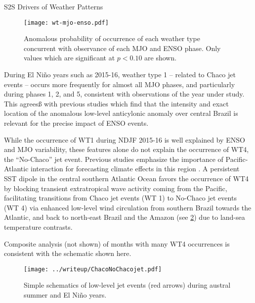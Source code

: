 \begin{block}{S2S Drivers of Weather Patterns}
  \begin{mdframed}
  \begin{figure}
    \caption{
  		Anomalous probability of occurrence of each weather type concurrent with observance of each MJO and ENSO phase.
  		Only values which are significant at $p<0.10$ are shown.
      \label{fig:wt-mjo-enso}
  	}
  	\noindent\texttt{[image: wt-mjo-enso.pdf]}
  \end{figure}
  \end{mdframed}

  During El Ni\~{n}o years such as 2015-16, weather type 1 -- related to Chaco jet events -- occurs more frequently for almost all MJO phases, and particularly during phases 1, 2, and 5, consistent with observations of the year under study.
  This agreesß with previous studies \cite[i.e.][]{Velasco1987} which find that the intensity and exact location of the anomalous low-level anticylonic anomaly over central Brazil is relevant for the precise impact of ENSO events.

  \vspace{0.5cm}

  While the occurrence of WT1 during NDJF 2015-16 is well explained by ENSO and MJO variability, these features alone do not explain the occurrence of WT4, the ``No-Chaco'' jet event.
  Previous studies emphasize the importance of Pacific-Atlantic interaction for forecasting climate effects in this region \cite{Vera:2006ib,Barreiro:2017ct,Lima:2017hw,Munoz2015}.
  A persistent SST dipole in the central southern Atlantic Ocean favors the occurrence of WT4 by blocking transient extratropical wave activity coming from the Pacific, facilitating transitions from Chaco jet events (WT 1) to No-Chaco jet events (WT 4) via enhanced low-level wind circulation from southern Brazil towards the Atlantic, and back to north-east Brazil and the Amazon (see \cref{fig:chaco-nochaco}) due to land-sea temperature contrasts.

  \vspace{0.5cm}

  Composite analysis (not shown) of months with many WT4 occurrences is consistent with the schematic shown here.

  \begin{mdframed}
  \begin{figure}
  	\noindent\texttt{[image: ../writeup/ChacoNoChacojet.pdf]}
    \caption{
      Simple schematics of low-level jet events (red arrows) during austral summer and El Ni\~no years.
      \label{fig:chaco-nochaco}
  	}

  \end{figure}
  \end{mdframed}
\end{block}
